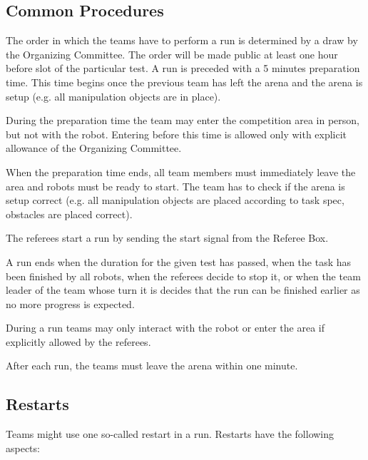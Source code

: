 \subsection{Common Procedures} 
The order in which the teams have to perform a run is determined by a draw by the Organizing Committee. The order will be made public at least one hour before slot of the particular test. A run is preceded with a 5 minutes preparation time. This time begins once the previous team has left the arena and the arena is setup (e.g. all manipulation objects are in place).
\par
During the preparation time the team may enter the competition area in person, but not with the robot. Entering before this time is allowed only with explicit allowance of the Organizing Committee. 
\par
When the preparation time ends, all team members must immediately leave the area and
robots must be ready to start. The team has to check if the arena is setup correct (e.g. all manipulation objects are placed according to task spec, obstacles are placed correct).
\par
The referees start a run by sending the start signal from the Referee Box.
\par
A run ends when the duration for the given test has passed, when the task has been finished by all robots, when the referees decide to stop it, or when the team leader of the team whose turn it is decides that the run can be finished earlier as no more progress is expected.
\par
During a run teams may only interact with the robot or enter the area if explicitly allowed by the referees. 
\par
After each run, the teams must leave the arena within one minute.

\subsection{Restarts}
Teams might use one so-called restart in a run. Restarts have the following aspects:


